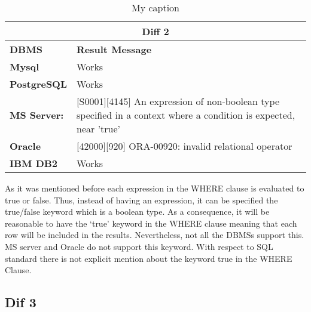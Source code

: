 \begin{table}[h]
\centering
\caption{My caption}
\label{my-label}
\begin{tabular}{|p{2cm}|p{12cm}|}
\hline
\multicolumn{2}{|c|}{\textbf{Diff 2}}                                                                                                                                                         \\ \hline
\textbf{DBMS}                              & \textbf{Result Message}                                                                                                                          \\ \hline
{\color[HTML]{333333} \textbf{Mysql}}      & {\color[HTML]{333333} Works}                                                                                                                     \\ \hline
{\color[HTML]{333333} \textbf{PostgreSQL}} & {\color[HTML]{333333} Works}                                                                                                                     \\ \hline
{\color[HTML]{333333} \textbf{MS Server:}} & {\color[HTML]{333333} {[}S0001{]}{[}4145{]} An expression of non-boolean type specified in a context where a condition is expected, near 'true'} \\ \hline
\textbf{Oracle}                            & {[}42000{]}{[}920{]} ORA-00920: invalid relational operator                                                                                      \\ \hline
\textbf{IBM DB2}                           & Works                                                                                                                                            \\ \hline
\end{tabular}
\end{table}

As it was mentioned before each expression in the WHERE clause is evaluated to true or false. Thus, instead of having an expression, it can be specified the true/false keyword which is a boolean type. As a consequence, it will be reasonable to have the ‘true’ keyword in the WHERE clause meaning that each row will be included in the results. Nevertheless, not all the DBMSs support this. MS server and Oracle do not support this keyword. With respect to SQL standard there is not explicit mention about the keyword true in the WHERE Clause. 

\subsection{Dif 3}
  
